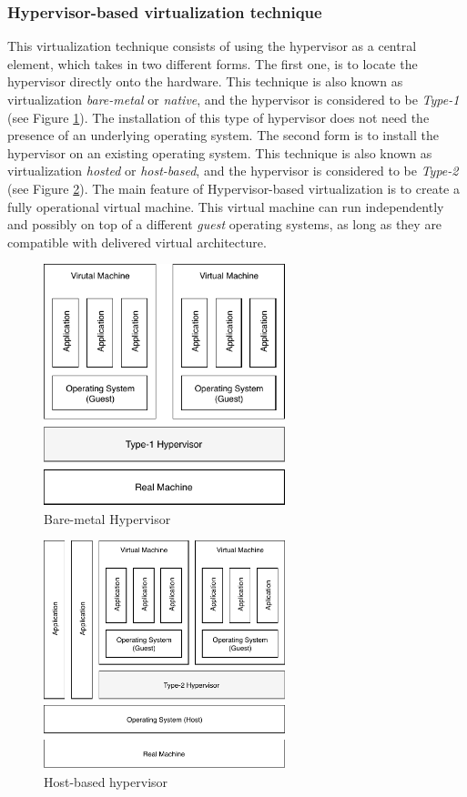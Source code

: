 	\subsubsection{Hypervisor-based virtualization technique}
	
	This virtualization technique consists of using the hypervisor as a central element, which takes in two different forms. The first one, is to locate the hypervisor directly onto the hardware. 
	This technique is also known as virtualization \textit{bare-metal} or \textit{native}, and the hypervisor is considered to be \textit{Type-1} (see Figure \ref{fig:Bare-metalHypervisor}). 
	The installation of this type of hypervisor does not need the presence of an underlying operating system. The second  form is to install the hypervisor on an existing operating system. 
	This technique is also known as virtualization \textit{hosted} or \textit{host-based}, and the hypervisor is considered to be \textit{Type-2} (see Figure \ref{fig:host-basedHypervisor}). 
	The main feature of Hypervisor-based virtualization is to create a fully operational virtual machine. This virtual machine can run independently and possibly on top of a different \textit{guest} operating systems, as long as they are compatible with delivered virtual architecture.
	
	\begin{figure}[!hbtp]
		\centering
		\includegraphics[width=7cm]{images/bare-metalHypervisor.pdf}
		\vspace{-0.2cm}
		\caption{Bare-metal Hypervisor}
		\label{fig:Bare-metalHypervisor}
	\end{figure}
	
	\begin{figure}[ht] %
		\centering
		\includegraphics[width=7cm]{images/hosted-BasedHypervisor.pdf}
		\vspace{-0.2cm}
		\caption{Host-based hypervisor}
		\label{fig:host-basedHypervisor}
	\end{figure}
	
